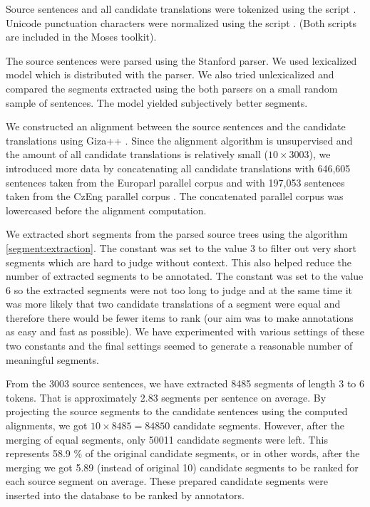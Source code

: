 Source sentences and all candidate translations were tokenized using the script
. Unicode punctuation characters were normalized using
the script . (Both scripts are included
in the Moses toolkit).

The source sentences were parsed using the Stanford parser. We used lexicalized
 model  which is
distributed with the parser. We also tried unlexicalized 
 and compared the segments extracted using the both
parsers on a small random sample of sentences. The 
model yielded subjectively better segments.

We constructed an alignment between the source sentences and the candidate
translations using Giza++ . Since the alignment algorithm is
unsupervised and the amount of all candidate translations is relatively small
($10 \times 3003$), we introduced more data by concatenating all candidate
translations with 646,605 sentences taken from the Europarl parallel corpus
 and with 197,053 sentences taken from the CzEng
parallel corpus .  The concatenated parallel corpus was
lowercased before the alignment computation. 

We extracted short segments from the parsed source trees using the algorithm
\ref{segment:extraction}. The constant  was set to the value 3
to filter out very short segments which are hard to judge without context. This
also helped reduce the number of extracted segments to be annotated. The
constant  was set to the value 6 so the extracted segments
were not too long to judge and at the same time it was more likely that two
candidate translations of a segment were equal and therefore there would be
fewer items to rank (our aim was to make annotations as easy and fast as
possible). We have experimented with various settings of these two constants
and the final settings seemed to generate a reasonable number of meaningful
segments.

From the 3003 source sentences, we have extracted 8485 segments of length 3 to
6 tokens. That is approximately 2.83 segments per sentence on average. By
projecting the source segments to the candidate sentences using the computed
alignments, we got $10 \times 8485 = 84850$ candidate segments. However, after
the merging of equal segments, only 50011 candidate segments were left. This
represents 58.9 \% of the original candidate segments, or in other words, after
the merging we got 5.89 (instead of original 10) candidate segments to be
ranked for each source segment on average. These prepared candidate segments
were inserted into the database to be ranked by annotators.

